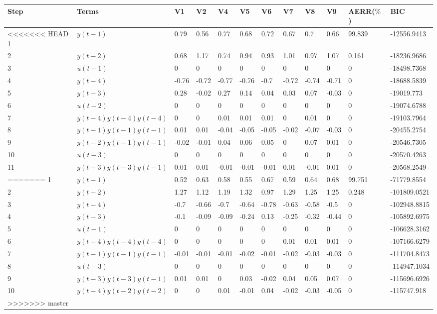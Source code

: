 \begin{tabular}{llllllllllll}
Step & Terms & V1 & V2 & V4 & V5 & V6 & V7 & V8 & V9 & AERR($\%$) & BIC \\ 
\hline 
<<<<<<< HEAD
1 & $y(t-1)$ & 0.79 & 0.56 & 0.77 & 0.68 & 0.72 & 0.67 & 0.7 & 0.66 & 99.839 & -12556.9413 \\ 
2 & $y(t-2)$ & 0.68 & 1.17 & 0.74 & 0.94 & 0.93 & 1.01 & 0.97 & 1.07 & 0.161 & -18236.9686 \\ 
3 & $u(t-1)$ & 0 & 0 & 0 & 0 & 0 & 0 & 0 & 0 & 0 & -18498.7368 \\ 
4 & $y(t-4)$ & -0.76 & -0.72 & -0.77 & -0.76 & -0.7 & -0.72 & -0.74 & -0.71 & 0 & -18688.5839 \\ 
5 & $y(t-3)$ & 0.28 & -0.02 & 0.27 & 0.14 & 0.04 & 0.03 & 0.07 & -0.03 & 0 & -19019.773 \\ 
6 & $u(t-2)$ & 0 & 0 & 0 & 0 & 0 & 0 & 0 & 0 & 0 & -19074.6788 \\ 
7 & $y(t-4)y(t-4)y(t-4)$ & 0 & 0 & 0.01 & 0.01 & 0.01 & 0 & 0.01 & 0 & 0 & -19103.7964 \\ 
8 & $y(t-1)y(t-1)y(t-1)$ & 0.01 & 0.01 & -0.04 & -0.05 & -0.05 & -0.02 & -0.07 & -0.03 & 0 & -20455.2754 \\ 
9 & $y(t-2)y(t-1)y(t-1)$ & -0.02 & -0.01 & 0.04 & 0.06 & 0.05 & 0 & 0.07 & 0.01 & 0 & -20546.7305 \\ 
10 & $u(t-3)$ & 0 & 0 & 0 & 0 & 0 & 0 & 0 & 0 & 0 & -20570.4263 \\ 
11 & $y(t-3)y(t-3)y(t-1)$ & 0.01 & 0.01 & -0.01 & -0.01 & -0.01 & 0.01 & -0.01 & 0.01 & 0 & -20568.2549 \\ 
=======
1 & $y(t-1)$ & 0.52 & 0.63 & 0.58 & 0.55 & 0.67 & 0.59 & 0.64 & 0.68 & 99.751 & -71779.8554 \\ 
2 & $y(t-2)$ & 1.27 & 1.12 & 1.19 & 1.32 & 0.97 & 1.29 & 1.25 & 1.25 & 0.248 & -101809.0521 \\ 
3 & $y(t-4)$ & -0.7 & -0.66 & -0.7 & -0.64 & -0.78 & -0.63 & -0.58 & -0.5 & 0 & -102948.8815 \\ 
4 & $y(t-3)$ & -0.1 & -0.09 & -0.09 & -0.24 & 0.13 & -0.25 & -0.32 & -0.44 & 0 & -105892.6975 \\ 
5 & $u(t-1)$ & 0 & 0 & 0 & 0 & 0 & 0 & 0 & 0 & 0 & -106628.3162 \\ 
6 & $y(t-4)y(t-4)y(t-4)$ & 0 & 0 & 0 & 0 & 0 & 0.01 & 0.01 & 0.01 & 0 & -107166.6279 \\ 
7 & $y(t-1)y(t-1)y(t-1)$ & -0.01 & -0.01 & -0.01 & -0.02 & -0.01 & -0.02 & -0.03 & -0.03 & 0 & -111704.8473 \\ 
8 & $u(t-3)$ & 0 & 0 & 0 & 0 & 0 & 0 & 0 & 0 & 0 & -114947.1034 \\ 
9 & $y(t-3)y(t-3)y(t-1)$ & 0.01 & 0.01 & 0 & 0.03 & -0.02 & 0.04 & 0.05 & 0.07 & 0 & -115696.6926 \\ 
10 & $y(t-4)y(t-2)y(t-2)$ & 0 & 0 & 0.01 & -0.01 & 0.04 & -0.02 & -0.03 & -0.05 & 0 & -115747.918 \\ 
>>>>>>> master
\hline 
\end{tabular}